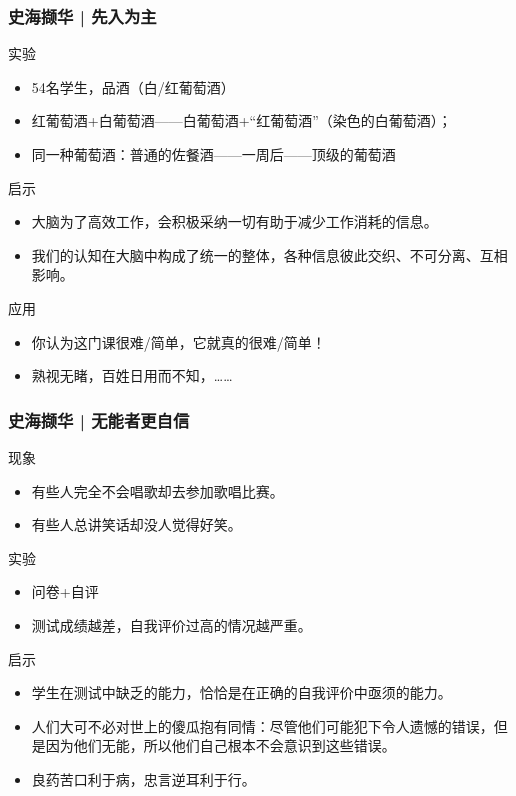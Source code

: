 \begin{frame}
  \frametitle{史海撷华 | 先入为主}
  \begin{block}{实验}
    \begin{itemize}
      \item 54名学生，品酒（白/红葡萄酒）
      \item 红葡萄酒+白葡萄酒——白葡萄酒+“红葡萄酒”（染色的白葡萄酒）；
      \item 同一种葡萄酒：普通的佐餐酒——一周后——顶级的葡萄酒
    \end{itemize}
  \end{block}
  \pause
  \begin{block}{启示}
    \begin{itemize}
      \item 大脑为了高效工作，会积极采纳一切有助于减少工作消耗的信息。
      \item 我们的认知在大脑中构成了统一的整体，各种信息彼此交织、不可分离、互相影响。
    \end{itemize}
  \end{block}
  \pause
  \begin{block}{应用}
    \begin{itemize}
      \item 你认为这门课很难/简单，它就真的很难/简单！
      \item 熟视无睹，百姓日用而不知，……
    \end{itemize}
  \end{block}
\end{frame}

\begin{frame}
  \frametitle{史海撷华 | 无能者更自信}
  \begin{block}{现象}
    \begin{itemize}
      \item 有些人完全不会唱歌却去参加歌唱比赛。
      \item 有些人总讲笑话却没人觉得好笑。
    \end{itemize}
  \end{block}
  \pause
  \begin{block}{实验}
    \begin{itemize}
      \item 问卷+自评
      \item 测试成绩越差，自我评价过高的情况越严重。
    \end{itemize}
  \end{block}
  \pause
  \begin{block}{启示}
    \begin{itemize}
      \item 学生在测试中缺乏的能力，恰恰是在正确的自我评价中亟须的能力。
      \item 人们大可不必对世上的傻瓜抱有同情：尽管他们可能犯下令人遗憾的错误，但是因为他们无能，所以他们自己根本不会意识到这些错误。
      \item 良药苦口利于病，忠言逆耳利于行。
    \end{itemize}
  \end{block}
\end{frame}

